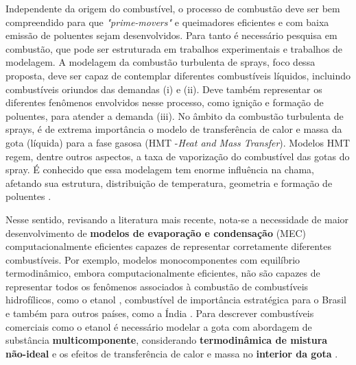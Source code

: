 Independente da origem do combustível, o processo de combustão deve ser bem compreendido para que \emph{"prime-movers"} e queimadores eficientes e com baixa emissão de poluentes sejam desenvolvidos.
Para tanto é necessário pesquisa em combustão, que pode ser estruturada em trabalhos experimentais e trabalhos de modelagem.
A modelagem da combustão turbulenta de sprays, foco dessa proposta, deve ser capaz de contemplar diferentes combustíveis líquidos, incluindo combustíveis oriundos das demandas (i) e (ii).
Deve também representar os diferentes fenômenos envolvidos nesse processo, como ignição e formação de poluentes, para atender a demanda (iii).
No âmbito da combustão turbulenta de sprays, é de extrema importância o modelo de transferência de calor e massa da gota (líquida) para a fase gasosa (HMT -\emph{Heat and Mass Transfer}).
Modelos HMT regem, dentre outros aspectos, a taxa de vaporização do combustível das gotas do spray.
É conhecido que essa modelagem tem enorme influência na chama, afetando sua estrutura, distribuição de temperatura, geometria e formação de poluentes \cite{JennyB2012}.


Nesse sentido, revisando a literatura mais recente, nota-se a necessidade de maior desenvolvimento de \textbf{modelos de evaporação e condensação} (MEC) computacionalmente eficientes capazes de representar corretamente diferentes combustíveis.
Por exemplo, modelos monocomponentes com equilíbrio termodinâmico, embora computacionalmente eficientes, não são capazes de representar todos os fenômenos associados à combustão de combustíveis hidrofílicos, como o etanol \cite{SacomanoF2024CF}, combustível de importância estratégica para o Brasil \cite{etanol-BNDES} e também para outros países, como a Índia \cite{etanol-India}.
Para descrever combustíveis comerciais como o etanol é necessário modelar a gota com abordagem de substância \textbf{multicomponente}, considerando \textbf{termodinâmica de mistura não-ideal} e os efeitos de transferência de calor e massa no \textbf{interior da gota} \cite{SacomanoF2024CF}.

